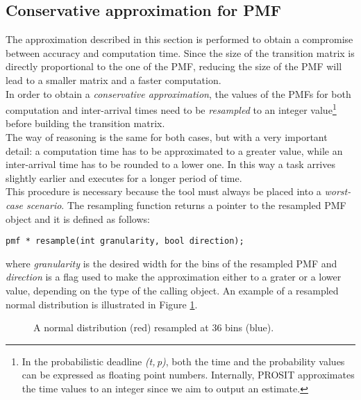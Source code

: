 \subsection{Conservative approximation for PMF}
The approximation described in this section is performed to obtain a compromise between accuracy and computation time. Since the size of the transition matrix is directly proportional to the one of the PMF, reducing the size of the PMF will lead to a smaller matrix and a faster computation.\\  
In order to obtain a \emph{conservative approximation}, the values of the PMFs for both computation and inter-arrival times need to be \emph{resampled} to an integer value\footnote{In the probabilistic deadline \emph{(t,\,p)}, both the time and the probability values can be expressed as floating point numbers. Internally, PROSIT approximates the time values to an integer since we aim to output an estimate.} before building the transition matrix.\\
The way of reasoning is the same for both cases, but with a very important detail: a computation time has to be approximated to a greater value, while an inter-arrival time has to be rounded to a lower one. In this way a task arrives slightly earlier and executes for a longer period of time.\\ 
This procedure is necessary because the tool must always be placed into a \emph{worst-case scenario}. The resampling function returns a pointer to the resampled PMF object and it is defined as follows:
\begin{lstlisting}[frame=bt, numbers=none]
  pmf * resample(int granularity, bool direction);
\end{lstlisting}

where \emph{granularity} is the desired width for the bins of the resampled PMF and \emph{direction} is a flag used to make the approximation either to a grater or a lower value, depending on the type of the calling object. An example of a resampled normal distribution is illustrated in Figure \ref{resample}.\\
\begin{figure}[H]
  \caption{A normal distribution (red) resampled at 36 bins (blue).}
  \label{resample}
\end{figure}

